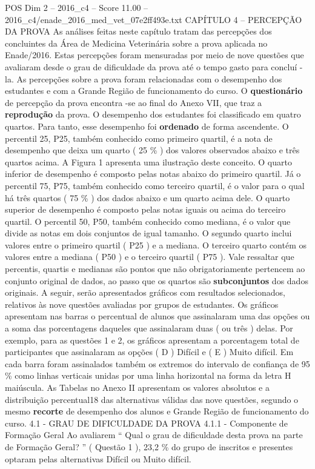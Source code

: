 \begin{textsample}{POS Dim 2 – 2016\_c4 – Score 11.00 – 2016\_c4/enade\_2016\_med\_vet\_07e2ff493e.txt}  \label{ex:f2_pos_075}
CAPÍTULO 4 – PERCEPÇÃO DA PROVA As análises feitas neste capítulo tratam das percepções dos concluintes da Área de Medicina Veterinária sobre a prova aplicada no Enade/2016.
Estas percepções foram mensuradas por meio de nove questões que avaliaram desde o grau de dificuldade da prova até o tempo gasto para concluí -la.
As percepções sobre a prova foram relacionadas com o desempenho dos estudantes e com a Grande Região de funcionamento do curso.
O \textbf{questionário} de percepção da prova encontra -se ao final do Anexo VII, que traz a \textbf{reprodução} da prova.
O desempenho dos estudantes foi classificado em quatro quartos.
Para tanto, esse desempenho foi \textbf{ordenado} de forma ascendente.
O percentil 25, P25, também conhecido como primeiro quartil, é a nota de desempenho que deixa um quarto ( 25 \% ) dos valores observados abaixo e três quartos acima.
A Figura 1 apresenta uma ilustração deste conceito.
O quarto inferior de desempenho é composto pelas notas abaixo do primeiro quartil.
Já o percentil 75, P75, também conhecido como terceiro quartil, é o valor para o qual há três quartos ( 75 \% ) dos dados abaixo e um quarto acima dele.
O quarto superior de desempenho é composto pelas notas iguais ou acima do terceiro quartil.
O percentil 50, P50, também conhecido como mediana, é o valor que divide as notas em dois conjuntos de igual tamanho.
O segundo quarto inclui valores entre o primeiro quartil ( P25 ) e a mediana.
O terceiro quarto contém os valores entre a mediana ( P50 ) e o terceiro quartil ( P75 ).
Vale ressaltar que percentis, quartis e medianas são pontos que não obrigatoriamente pertencem ao conjunto original de dados, ao passo que os quartos são \textbf{subconjuntos} dos dados originais.
A seguir, serão apresentados gráficos com resultados selecionados, relativos às nove questões avaliadas por grupos de estudantes.
Os gráficos apresentam nas barras o percentual de alunos que assinalaram uma das opções ou a soma das porcentagens daqueles que assinalaram duas ( ou três ) delas.
Por exemplo, para as questões 1 e 2, os gráficos apresentam a porcentagem total de participantes que assinalaram as opções ( D ) Difícil e ( E ) Muito difícil.
Em cada barra foram assinalados também os extremos do intervalo de confiança de 95 \% como linhas verticais unidas por uma linha horizontal na forma da letra H maiúscula.
As Tabelas no Anexo II apresentam os valores absolutos e a distribuição percentual18 das alternativas válidas das nove questões, segundo o mesmo \textbf{recorte} de desempenho dos alunos e Grande Região de funcionamento do curso. 4.1 - GRAU DE DIFICULDADE DA PROVA 4.1.1 - Componente de Formação Geral Ao avaliarem “ Qual o grau de dificuldade desta prova na parte de Formação Geral? ” ( Questão 1 ), 23,2 \% do grupo de inscritos e presentes optaram pelas alternativas Difícil ou Muito difícil.

\end{textsample}

